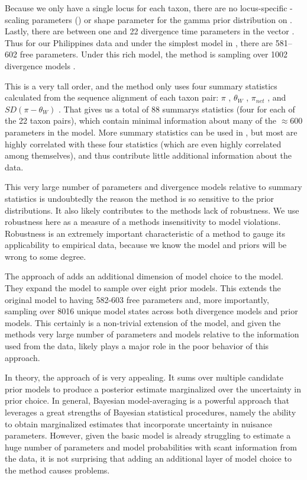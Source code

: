\documentclass[letterpaper,12pt]{article}
\begin{document}
\begin{linenumbers}
Because we only have a single locus for each taxon, there are no locus-specific
\myTheta{}-scaling parameters (\locusMutationRateScalar{}) or
\locusRateHetShapeParameter shape parameter for the gamma prior distribution on
\locusMutationRateScalar{}.
Lastly, there are between one and 22 divergence time parameters \divt{} in
the vector \divtvector.
Thus for our Philippines data and under the simplest model in \msb, there are
581--602 free parameters.
Under this rich model, the method is sampling over 1002 divergence models
\citep[i.e., the number of integer partitions of $Y=22$][]{Oaks2012}.

This is a very tall order, and the method only uses four summary statistics
calculated from the sequence alignment of each taxon pair:
$\pi$ \citep{Tajima1983}, $\theta_W$
\citep{Watterson1975}, $\pi_{net}$ \citep{Takahata1985}, and
$SD(\pi-\theta_W)$ \citep{Tajima1989}.
That gives us a total of 88 summarys statistics (four for each of the 22 taxon
pairs), which contain minimal information about many of the $\approx 600$
parameters in the model.
More summary statistics can be used in \msb, but most are highly correlated
with these four statistics (which are even highly correlated among themselves),
and thus contribute little additional information about the data.

This very large number of parameters and divergence models relative to 
summary statistics is undoubtedly the reason the method is so sensitive
to the prior distributions.
It also likely contributes to the methods lack of robustness.
We use robustness here as a measure of a methods insensitivity to model
violations.
Robustness is an extremely important characteristic of a method to gauge its
applicability to empirical data, because we know the model and priors will be
wrong to some degree.

The approach of \citet{Hickerson2013} adds an additional dimension of model
choice to the model. They expand the model to sample over eight prior models.
This extends the original model to having 582-603 free parameters and, more
importantly, sampling over 8016 unique model states across both divergence
models and prior models.
This certainly is a non-trivial extension of the model, and given the methods
very large number of parameters and models relative to the information
used from the data, likely plays a major role in the poor behavior of this
approach.

In theory, the approach of \citet{Hickerson2013} is very appealing.  It sums
over multiple candidate prior models to produce a posterior estimate
marginalized over the uncertainty in prior choice.
In general, Bayesian model-averaging is a powerful approach that leverages a
great strengths of Bayesian statistical procedures, namely the ability to
obtain marginalized estimates that incorporate uncertainty in nuisance
parameters.
However, given the basic \msb model is already struggling to estimate
a huge number of parameters and model probabilities with scant information
from the data, it is not surprising that adding an additional layer of
model choice to the method causes problems.


\end{linenumbers}
\end{document}
